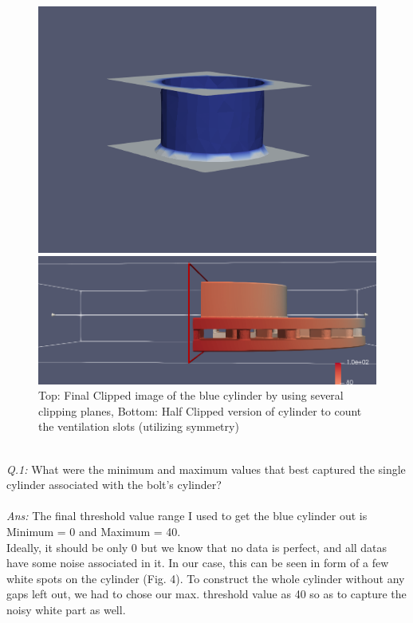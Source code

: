 \documentclass[a4paper,11pt]{article}
\theoremstyle{mytheor}
\begin{document}
\begin{figure}[!h]
    \centering
    \includegraphics{Q3_Final_Clip.PNG}
    
    \vspace{1 cm}
    \includegraphics[scale = 0.70]{Q3_Ventilation.PNG}
    
    \caption{Top: Final Clipped image of the blue cylinder by using several clipping planes, Bottom: Half Clipped version of cylinder to count the ventilation slots (utilizing symmetry)}
    \label{fig:q32}
\end{figure}
\clearpage

\textit{\\ Q.1:} What were the minimum and maximum values that best captured the single cylinder associated with the bolt’s cylinder? \\ \\ 
\textit{Ans:} The final threshold value range I used to get the blue cylinder out is Minimum = 0 and Maximum = 40. \\ Ideally, it should be only 0 but we know that no data is perfect, and all datas have some noise associated in it. In our case, this can be seen in form of a few white spots on the cylinder (Fig. 4). To construct the whole cylinder without any gaps left out, we had to chose our max. threshold value as 40 so as to capture the noisy white part as well.  
\end{document}
